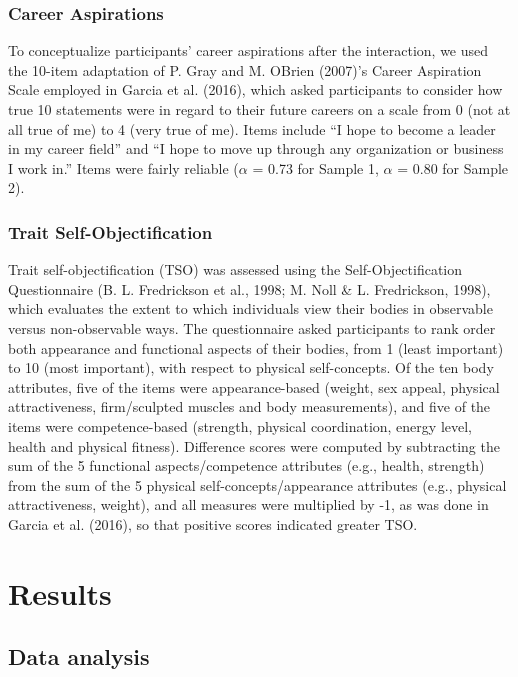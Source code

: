 \documentclass[man]{apa6}
\begin{document}
\subsubsection{Career Aspirations}\label{career-aspirations}

To conceptualize participants' career aspirations after the interaction,
we used the 10-item adaptation of P. Gray and M. OBrien (2007)'s Career
Aspiration Scale employed in Garcia et al. (2016), which asked
participants to consider how true 10 statements were in regard to their
future careers on a scale from 0 (not at all true of me) to 4 (very true
of me). Items include \enquote{I hope to become a leader in my career
field} and \enquote{I hope to move up through any organization or
business I work in.} Items were fairly reliable (\(\alpha\) = 0.73 for
Sample 1, \(\alpha\) = 0.80 for Sample 2).

\subsubsection{Trait
Self-Objectification}\label{trait-self-objectification}

Trait self-objectification (TSO) was assessed using the
Self-Objectification Questionnaire (B. L. Fredrickson et al., 1998; M.
Noll \& L. Fredrickson, 1998), which evaluates the extent to which
individuals view their bodies in observable versus non-observable ways.
The questionnaire asked participants to rank order both appearance and
functional aspects of their bodies, from 1 (least important) to 10 (most
important), with respect to physical self-concepts. Of the ten body
attributes, five of the items were appearance-based (weight, sex appeal,
physical attractiveness, firm/sculpted muscles and body measurements),
and five of the items were competence-based (strength, physical
coordination, energy level, health and physical fitness). Difference
scores were computed by subtracting the sum of the 5 functional
aspects/competence attributes (e.g., health, strength) from the sum of
the 5 physical self-concepts/appearance attributes (e.g., physical
attractiveness, weight), and all measures were multiplied by -1, as was
done in Garcia et al. (2016), so that positive scores indicated greater
TSO.

\section{Results}\label{results}

\subsection{Data analysis}\label{data-analysis}
\end{document}
